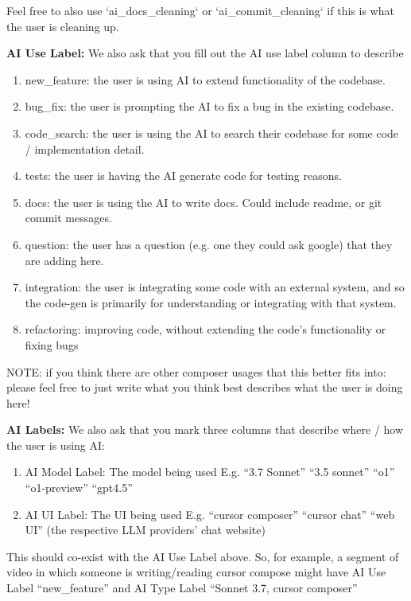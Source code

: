 \documentclass{article}
\begin{document}
\begin{instructionbox}
Feel free to also use `ai\_docs\_cleaning` or `ai\_commit\_cleaning` if this is what the user is cleaning up.

\textbf{AI Use Label:}
We also ask that you fill out the AI use label column to describe 
\begin{enumerate}
    \item new\_feature: the user is using AI to extend functionality of the codebase.
    \item bug\_fix: the user is prompting the AI to fix a bug in the existing codebase.
    \item code\_search: the user is using the AI to search their codebase for some code / implementation detail. 
    \item tests: the user is having the AI generate code for testing reasons.
    \item docs: the user is using the AI to write docs. Could include readme, or git commit messages.
    \item question: the user has a question (e.g. one they could ask google) that they are adding here.
    \item integration: the user is integrating some code with an external system, and so the code-gen is primarily for understanding or integrating with that system.
    \item refactoring: improving code, without extending the code’s functionality or fixing bugs
\end{enumerate}

NOTE: if you think there are other composer usages that this better fits into: please feel free to just write what you think best describes what the user is doing here!

\textbf{AI Labels:}
We also ask that you mark three columns that describe where / how the user is using AI:
\begin{enumerate}
    \item AI Model Label: The model being used E.g. “3.7 Sonnet” “3.5 sonnet” “o1” “o1-preview” “gpt4.5”
    \item AI UI Label: The UI being used E.g. “cursor composer” “cursor chat” “web UI” (the respective LLM providers’ chat website)
\end{enumerate}

This should co-exist with the AI Use Label above. So, for example, a segment of video in which someone is writing/reading cursor compose might have AI Use Label “new\_feature” and AI Type Label “Sonnet 3.7, cursor composer”



\end{instructionbox}
\end{document}
